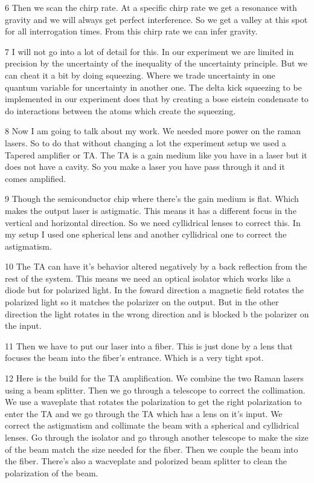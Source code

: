 6 Then we scan the chirp rate. At a specific chirp rate we get a resonance with gravity and we will always get perfect interference. So we get a valley at this spot for all interrogation times. From this chirp rate we can infer gravity.

7 I will not go into a lot of detail for this. In our experiment we are limited in precision by the uncertainty of the inequality of the uncertainty principle. But we can cheat it a bit by doing squeezing. Where we trade uncertainty in one quantum variable for uncertainty in another one. The delta kick squeezing to be implemented in our experiment does that by creating a bose eistein condensate to do interactions between the atoms which create the squeezing.

8 Now I am going to talk about my work. We needed more power on the raman lasers. So to do that without changing a lot the experiment setup we used a Tapered amplifier or TA. The TA is a gain medium like you have in a laser but it does not have a cavity. So you make a laser you have pass through it and it comes amplified.

9 Though the semiconductor chip where there's the gain medium is flat. Which makes the output laser is astigmatic. This means it has a different focus in the vertical and horizontal direction. So we need cyllidrical lenses to correct this. In my setup I used one spherical lens and another cyllidrical one to correct the astigmatism.

10 The TA can have it's behavior altered negatively by a back reflection from the rest of the system. This means we need an optical isolator which works like a diode but for polarized light. In the foward direction a magnetic field rotates the polarized light so it matches the polarizer on the output. But in the other direction the light rotates in the wrong direction and is blocked b the polarizer on the input.

11 Then we have to put our laser into a fiber. This is just done by a lens that focuses the beam into the fiber's entrance. Which is a very tight spot.

12 Here is the build for the TA amplification. We combine the two Raman lasers using a beam splitter. Then we go through a telescope to correct the collimation. We use a waveplate that rotates the polarization to get the right polarization to enter the TA and we go through the TA which has a lens on it's input. We correct the astigmatism and collimate the beam with a spherical and cyllidrical lenses. Go through the isolator and go through another telescope to make the size of the beam match the size needed for the fiber. Then we couple the beam into the fiber. There's also a wacveplate and polorized beam splitter to clean the polarization of the beam.

